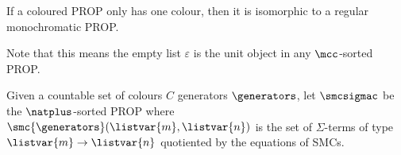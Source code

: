 \begin{remark}
    If a coloured PROP only has one colour, then it is isomorphic to a regular
    monochromatic PROP.
\end{remark}

Note that this means the empty list \(\varepsilon\) is the unit
object in any \(\mcc\)-sorted PROP.

\begin{definition}\label{def:freely-generated-coloured-prop}
    Given a countable set of colours \(C\) generators \(\generators\), let
    \(\smcsigmac\) be the
    \(\natplus\)-sorted PROP where
    \(\smc{\generators}(\listvar{m}, \listvar{n})\) is the set of
    \(\Sigma\)-terms of type \(\listvar{m} \to \listvar{n}\) quotiented by
    the equations of SMCs.
\end{definition}
